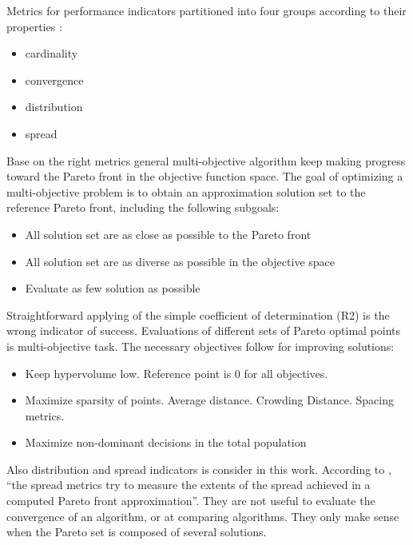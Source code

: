             Metrics for performance indicators partitioned into four groups according to their properties \cite{Audet2018PerformanceII}: 
            \begin{itemize}
                \item cardinality
                \item convergence
                \item distribution
                \item spread
            \end{itemize}
        
            Base on the right metrics general multi-objective algorithm keep making progress toward the Pareto front in the objective function space.
            The goal of optimizing a multi-objective problem is to obtain an approximation solution set to the reference Pareto front, including the following subgoals:
            \begin{itemize}
                \item All solution set are as close as possible to the Pareto front
                \item All solution set are as diverse as possible in the objective space
                \item Evaluate as few solution as possible
            \end{itemize}
            Straightforward applying of the simple coefficient of determination (R2) is the wrong indicator of success. Evaluations of different sets of Pareto optimal points is multi-objective task.
            The necessary objectives follow for improving solutions:
            \begin{itemize}
                \item Keep hypervolume low. Reference point is 0 for all objectives.
                \item Maximize sparsity of points. Average distance. Crowding Distance. Spacing metrics.
                \item Maximize non-dominant decisions in the total population
            \end{itemize}

            Also distribution and spread indicators is consider in this work. According to \cite{CustodioMVV11}, “the spread metrics try to measure the extents of the spread achieved in a computed Pareto front approximation”. They are not useful to evaluate the convergence of an algorithm, or at comparing algorithms. They only make sense when the Pareto set is composed of several solutions.

